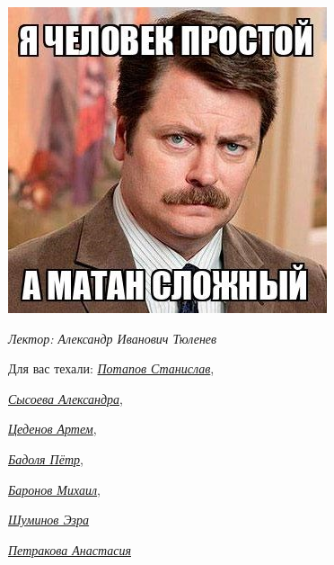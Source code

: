 \begin{titlepage}
\begin{minipage}{0.3\textwidth}
        \end{minipage}
    \begin{minipage}{0.365\textwidth}
    \includegraphics[width=\textwidth]{images/mem2.jpg}
    \end{minipage}
    \vspace{10pt}

 
 
     \textit{\large{Лектор: Александр Иванович Тюленев}
} 

	\vfill
	\begin{flushright}
    \noindent
    Для вас техали: \href{https://vk.com/invader17}{\textit{Потапов Станислав}}, 
  
    \href{https://vk.com/salexame}{\textit{ Сысоева Александра}}, 
    
    \href{https://vk.com/darkness11235}{\textit{ Цеденов Артем}},  
    
    \href{https://vk.com/akzium}{\textit{Бадоля Пётр}},
    
    \href{https://vk.com/id389655743}{\textit{Баронов Михаил}},

    \href{https://t.me/YamSuf}{\textit{Шуминов Эзра}}
    
    \href{https://vk.com/prizrakkota}{\textit{Петракова Анастасия}}
  
	\end{flushright}


	\pagebreak
\end{titlepage}